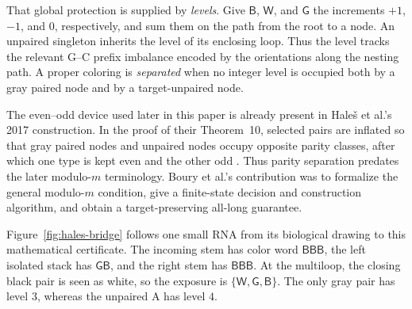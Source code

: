 \documentclass[11pt]{article}
\newcommand{\Bcol}{\mathsf{B}}
\newcommand{\Wcol}{\mathsf{W}}
\newcommand{\Gray}{\mathsf{G}}
\begin{document}
That global protection is supplied by \emph{levels}.  Give $\Bcol$, $\Wcol$, and $\Gray$ the increments $+1$, $-1$, and $0$, respectively, and sum them on the path from the root to a node.  An unpaired singleton inherits the level of its enclosing loop.  Thus the level tracks the relevant G--C prefix imbalance encoded by the orientations along the nesting path.  A proper coloring is \emph{separated} when no integer level is occupied both by a gray paired node and by a target-unpaired node.

The even--odd device used later in this paper is already present in Hale\v{s} et al.'s 2017 construction.  In the proof of their Theorem~10, selected pairs are inflated so that gray paired nodes and unpaired nodes occupy opposite parity classes, after which one type is kept even and the other odd \citep{hales2017}.  Thus parity separation predates the later modulo-$m$ terminology.  Boury et al.'s contribution was to formalize the general modulo-$m$ condition, give a finite-state decision and construction algorithm, and obtain a target-preserving all-long guarantee.

Figure~\ref{fig:hales-bridge} follows one small RNA from its biological drawing to this mathematical certificate.  The incoming stem has color word $\Bcol\Bcol\Bcol$, the left isolated stack has $\Gray\Bcol$, and the right stem has $\Bcol\Bcol\Bcol$.  At the multiloop, the closing black pair is seen as white, so the exposure is $\{\Wcol,\Gray,\Bcol\}$.  The only gray pair has level $3$, whereas the unpaired A has level $4$.
\end{document}
